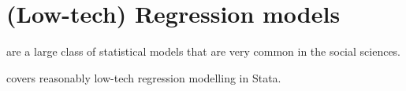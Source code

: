 \chapter[Regression models]{(Low-tech) Regression models}%
	\label{ch:reg}

	 are a large class of statistical models that are very common in the social sciences.%

	 covers reasonably low-tech regression modelling in Stata.%
